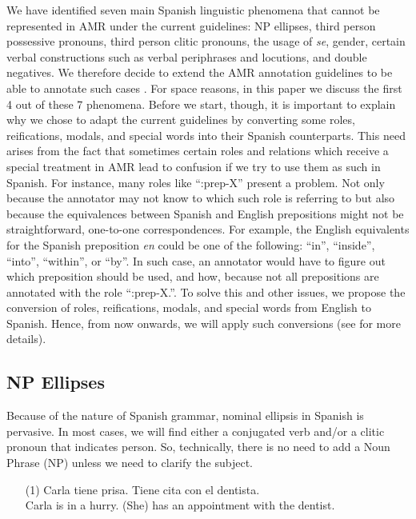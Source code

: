 \documentclass[10pt, a4paper]{article}
\begin{document}
We have identified seven main Spanish linguistic phenomena that cannot be represented in AMR under the current guidelines: NP ellipses, third person possessive pronouns, third person clitic pronouns, the usage of \textit{se}, gender, certain verbal constructions such as verbal periphrases and locutions, and double negatives. We therefore decide to extend the AMR annotation guidelines to be able to annotate such cases \cite{migueles2017study}. For space reasons, in this paper we discuss the first 4 out of these 7 phenomena. Before we start, though, it is important to explain why we chose to adapt the current guidelines by converting some roles, reifications, modals, and special words into their Spanish counterparts. This need arises from the fact that sometimes certain roles and relations which receive a special treatment in AMR lead to confusion if we try to use them as such in Spanish. For instance, many roles like ``:prep-X'' present a problem. Not only because the annotator may not know to which such role is referring to but also because the equivalences between Spanish and English prepositions might not be straightforward, one-to-one correspondences. For example, the English equivalents for the Spanish preposition \emph{en} could be one of the following: ``in'', ``inside'', ``into'', ``within'', or ``by''. In such case, an annotator would have to figure out which preposition should be used, and how, because not all prepositions are annotated with the role ``:prep-X.''. To solve this and other issues, we propose the conversion of roles, reifications, modals, and special words from English to Spanish. Hence, from now onwards, we will apply such conversions (see \cite{migueles2017study} for more details).

\subsection{NP Ellipses}

Because of the nature of Spanish grammar, nominal ellipsis in Spanish is pervasive. In most cases, we will find either a conjugated verb and/or a clitic pronoun that indicates person. So, technically, there is no need to add a Noun Phrase (NP) unless we need to clarify the subject.

\begin{enumerate}
\item[(1)]Carla tiene prisa. Tiene cita con el dentista.\\
Carla is in a hurry. (She) has an appointment with the dentist.
\end{enumerate}
\end{document}
